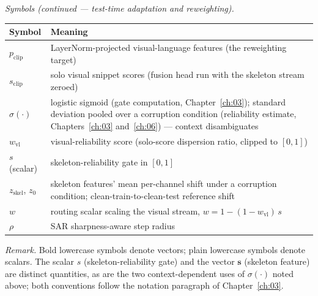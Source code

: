 \medskip
\noindent\textit{Symbols (continued --- test-time adaptation and reweighting).}

\begin{center}
\begin{tabular}{@{}lp{10.5cm}@{}}
\toprule
Symbol & Meaning \\
\midrule
$p_{\mathrm{clip}}$ & LayerNorm-projected visual-language features (the
             reweighting target) \\
$s_{\mathrm{clip}}$ & solo visual snippet scores (fusion head run with the
             skeleton stream zeroed) \\
$\sigma(\cdot)$ & logistic sigmoid (gate computation,
             Chapter~\ref{ch:03}); standard deviation pooled over a
             corruption condition (reliability estimate,
             Chapters~\ref{ch:03} and~\ref{ch:06}) --- context disambiguates \\
$w_{\mathrm{vl}}$ & visual-reliability score (solo-score dispersion ratio,
             clipped to $[0,1]$) \\
$s$ (scalar) & skeleton-reliability gate in $[0,1]$ \\
$z_{\mathrm{skel}}$, $z_0$ & skeleton features' mean per-channel shift under a
             corruption condition; clean-train-to-clean-test reference shift \\
$w$ & routing scalar scaling the visual stream,
             $w = 1-(1-w_{\mathrm{vl}})\,s$ \\
$\rho$ & SAR sharpness-aware step radius \\
\bottomrule
\end{tabular}
\end{center}

\medskip
\noindent\textit{Remark.} Bold lowercase symbols denote vectors; plain
lowercase symbols denote scalars. The scalar $s$ (skeleton-reliability gate)
and the vector $\mathbf{s}$ (skeleton feature) are distinct quantities, as
are the two context-dependent uses of $\sigma(\cdot)$ noted above; both
conventions follow the notation paragraph of Chapter~\ref{ch:03}.
